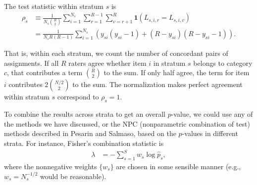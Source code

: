 \documentclass[]{article}
\begin{document}
The test statistic within stratum $s$ is
\begin{align*}
\rho_s &\equiv \frac{1}{N_s {R \choose 2}} \sum_{i=1}^{N_s}
              \sum_{r=1}^{R-1} \sum_{v=r+1}^R \mathbf{1}(L_{s,i,r} = L_{s,i,v}) \\
              &= \frac{1}{N_s R(R-1)} \sum_{i=1}^{N_s}
                (y_{si}(y_{si}-1) + (R-y_{si})(R-y_{si}-1)).
\end{align*}

That is, within each stratum, we count the number of concordant pairs of
assignments.
If all $R$ raters agree whether item $i$ in stratum $s$ belongs to category
$c$, that contributes a term ${R \choose 2}$ to the sum.
If only half agree, the term for item $i$ contributes $2 {N/2 \choose 2}$ to
the sum.
The normalization makes perfect agreement within stratum $s$ correspond to
$\rho_s = 1$.

To combine the results across strata to get an overall $p$-value, we could
use any of the methods we have discussed, or the NPC (nonparametric
combination of test) methods described in Pesarin and Salmaso, based on
the $p$-values in different strata.
For instance, Fisher's combination statistic is
\begin{align*}
    \lambda &= - \sum_{s=1}^S w_s \log \hat{p}_s,
\end{align*}
where the nonnegative weights $\{w_s\}$ are chosen in some sensible manner
(e.g., $w_s = N_s^{-1/2}$ would be reasonable).
\end{document}
